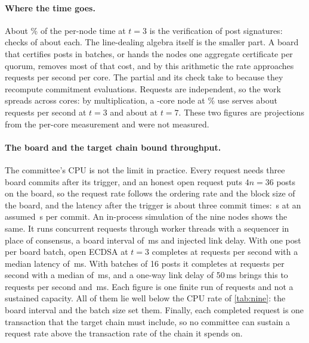 \paragraph{Where the time goes.} About \ninePostSharePct{}\% of the per-node time at $t = 3$ is the verification of post signatures: \ninePostChecksLow{} checks of about \ninePostCheckMicros{}\us{} each. The line-dealing algebra itself is the smaller part. A board that certifies posts in batches, or hands the nodes one aggregate certificate per quorum, removes most of that cost, and by this arithmetic the rate approaches \nineBatchedRate{} requests per second per core. The partial and its check take \ninePartialMinMicros{} to \ninePartialMaxMicros{}\us{} because they recompute commitment evaluations. Requests are independent, so the work spreads across cores: by multiplication, a \nineNodeCores{}-core node at \nineNodeUsePct{}\% use serves about \nineNodeRateLow{} requests per second at $t = 3$ and about \nineNodeRateHigh{} at $t = 7$. These two figures are projections from the per-core measurement and were not measured.

\paragraph{The board and the target chain bound throughput.} The committee's CPU is not the limit in practice. Every request needs three board commits after its trigger, and an honest open request puts $4n = 36$ posts on the board, so the request rate follows the ordering rate and the block size of the board, and the latency after the trigger is about three commit times: \latencySeconds{}\,s at an assumed \commitSeconds{}\,s per commit. An in-process simulation of the nine nodes shows the same. It runs \simRequests{} concurrent requests through worker threads with a sequencer in place of consensus, a board interval of \simBoardIntervalMs{}\,ms and injected link delay. With one post per board batch, open ECDSA at $t = 3$ completes at \simLinkLowZeroOneRate{} requests per second with a median latency of \simLinkLowZeroOnePFifty{}\,ms. With batches of 16 posts it completes at \simLinkLowZeroSixteenRate{} requests per second with a median of \simLinkLowZeroSixteenPFifty{}\,ms, and a one-way link delay of 50\,ms brings this to \simLinkLowFiftySixteenRate{} requests per second and \simLinkLowFiftySixteenPFifty{}\,ms. Each figure is one finite run of \simRequests{} requests and not a sustained capacity. All of them lie well below the CPU rate of \cref{tab:nine}: the board interval and the batch size set them. Finally, each completed request is one transaction that the target chain must include, so no committee can sustain a request rate above the transaction rate of the chain it spends on.
